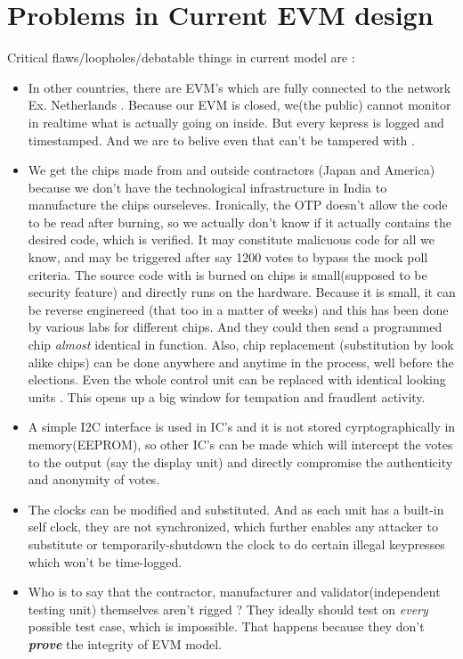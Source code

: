 \documentclass[12pt]{report}
\begin{document}
\section{Problems in Current EVM design} 
Critical flaws/loopholes/debatable things in current model are : 
\begin{itemize}
  \label{sec:standalone}
  \item In other countries, there are EVM's which are fully connected to the network Ex. Netherlands . 
  Because our EVM is closed, we(the public) cannot monitor in realtime what is actually going on inside. But every kepress is logged and timestamped. And we are to belive even that can't be tampered with .

  \label{sec:otp}
  \item We get the chips made from and outside contractors (Japan and America) because we don't have the technological infrastructure in India to manufacture the chips ourseleves.
  Ironically, the OTP doesn't allow the code to be read after burning, so we actually don't know if it actually contains the desired code, which is verified. It may constitute malicuous code for all we know, and may be triggered after say 1200 votes to bypass the mock poll criteria.
  The source code with is burned on chips is small(supposed to be security feature) and directly runs on the hardware. Because it is small, it can be reverse enginereed (that too in a matter of weeks) and this has been done by various labs for different chips. And they could then send a programmed chip \textit{almost} identical in function.
  Also, chip replacement (substitution by look alike chips) can be done anywhere and anytime in the process, well before the elections. Even the whole control unit can be replaced with identical looking units . This opens up a big window for tempation and fraudlent activity.
  \item A simple I2C interface is used in IC's and it is not stored cyrptographically in memory(EEPROM), so other IC's can be made which will intercept the votes to the output (say the display unit) and directly compromise the authenticity and anonymity of votes.

  \label{sec:clock}
  \item The clocks can be modified and substituted. And as each unit has a built-in self clock, they are not synchronized, which further enables any attacker to substitute or temporarily-shutdown the clock to do certain illegal keypresses which won't be time-logged.

  \label{sec:contract}
  \item Who is to say that the contractor, manufacturer and validator(independent testing unit) themselves aren't rigged ? They ideally should test on \textit{every} possible test case, which is impossible. That happens because they don't \textbf{\textit{prove}} the integrity of EVM model.


\end{itemize}
\end{document}
